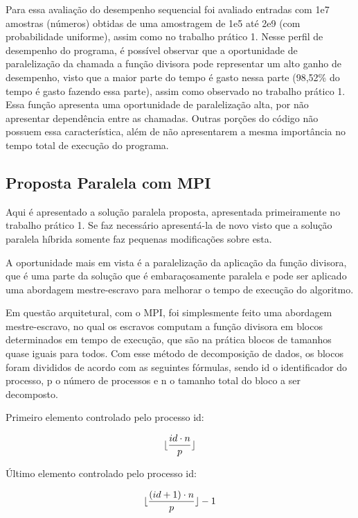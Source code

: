 \documentclass[12pt]{article}
\DeclarePairedDelimiter\floor{\lfloor}{\rfloor}
\begin{document}
Para essa avaliação do desempenho sequencial foi avaliado entradas com 1e7 amostras (números) obtidas de uma amostragem de 1e5 até 2e9 (com probabilidade uniforme), assim como no trabalho prático 1. Nesse perfil de desempenho do programa, é possível observar que a oportunidade de paralelização da chamada a função divisora pode representar um alto ganho de desempenho, visto que a maior parte do tempo é gasto nessa parte (98,52\% do tempo é gasto fazendo essa parte), assim como observado no trabalho prático 1. Essa função apresenta uma oportunidade de paralelização alta, por não apresentar dependência entre as chamadas. Outras porções do código não possuem essa característica, além de não apresentarem a mesma importância no tempo total de execução do programa.

\subsection{Proposta Paralela com MPI}

Aqui é apresentado a solução paralela proposta, apresentada primeiramente no trabalho prático 1. Se faz necessário apresentá-la de novo visto que a solução paralela híbrida somente faz pequenas modificações sobre esta.

A oportunidade mais em vista é a paralelização da aplicação da função divisora, que é uma parte da solução que é embaraçosamente paralela e pode ser aplicado uma abordagem mestre-escravo para melhorar o tempo de execução do algoritmo.

Em questão arquitetural, com o MPI, foi simplesmente feito uma abordagem mestre-escravo, no qual os escravos computam a função divisora em blocos determinados em tempo de execução, que são na prática blocos de tamanhos quase iguais para todos. Com esse método de decomposição de dados, os blocos foram divididos de acordo com as seguintes fórmulas, sendo id o identificador do processo, p o número de processos e n o tamanho total do bloco a ser decomposto.

Primeiro elemento controlado pelo processo id:

\begin{equation}
	\floor{\frac{id\cdot n}{p}}
\end{equation}

Último elemento controlado pelo processo id:

\begin{equation}
	\floor{\frac{(id+1)\cdot n}{p}}-1
\end{equation}
\end{document}
